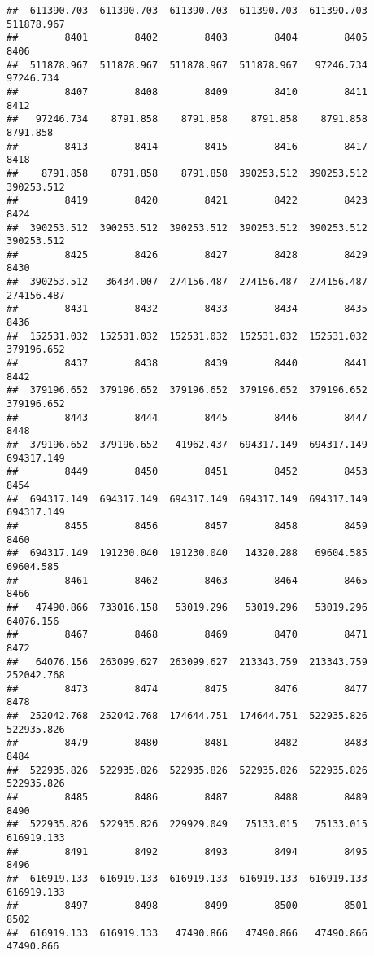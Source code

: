 \documentclass[
]{book}
\begin{document}
\begin{verbatim}
##  611390.703  611390.703  611390.703  611390.703  611390.703  511878.967 
##        8401        8402        8403        8404        8405        8406 
##  511878.967  511878.967  511878.967  511878.967   97246.734   97246.734 
##        8407        8408        8409        8410        8411        8412 
##   97246.734    8791.858    8791.858    8791.858    8791.858    8791.858 
##        8413        8414        8415        8416        8417        8418 
##    8791.858    8791.858    8791.858  390253.512  390253.512  390253.512 
##        8419        8420        8421        8422        8423        8424 
##  390253.512  390253.512  390253.512  390253.512  390253.512  390253.512 
##        8425        8426        8427        8428        8429        8430 
##  390253.512   36434.007  274156.487  274156.487  274156.487  274156.487 
##        8431        8432        8433        8434        8435        8436 
##  152531.032  152531.032  152531.032  152531.032  152531.032  379196.652 
##        8437        8438        8439        8440        8441        8442 
##  379196.652  379196.652  379196.652  379196.652  379196.652  379196.652 
##        8443        8444        8445        8446        8447        8448 
##  379196.652  379196.652   41962.437  694317.149  694317.149  694317.149 
##        8449        8450        8451        8452        8453        8454 
##  694317.149  694317.149  694317.149  694317.149  694317.149  694317.149 
##        8455        8456        8457        8458        8459        8460 
##  694317.149  191230.040  191230.040   14320.288   69604.585   69604.585 
##        8461        8462        8463        8464        8465        8466 
##   47490.866  733016.158   53019.296   53019.296   53019.296   64076.156 
##        8467        8468        8469        8470        8471        8472 
##   64076.156  263099.627  263099.627  213343.759  213343.759  252042.768 
##        8473        8474        8475        8476        8477        8478 
##  252042.768  252042.768  174644.751  174644.751  522935.826  522935.826 
##        8479        8480        8481        8482        8483        8484 
##  522935.826  522935.826  522935.826  522935.826  522935.826  522935.826 
##        8485        8486        8487        8488        8489        8490 
##  522935.826  522935.826  229929.049   75133.015   75133.015  616919.133 
##        8491        8492        8493        8494        8495        8496 
##  616919.133  616919.133  616919.133  616919.133  616919.133  616919.133 
##        8497        8498        8499        8500        8501        8502 
##  616919.133  616919.133   47490.866   47490.866   47490.866   47490.866 

\end{verbatim}
\end{document}
